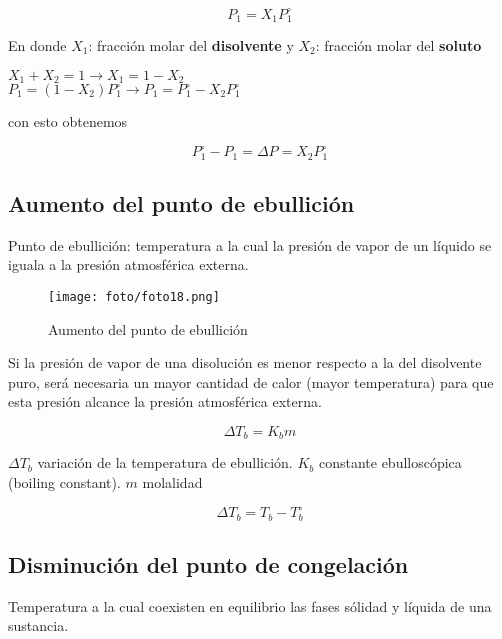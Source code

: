 \documentclass[]{article}
\begin{document}
\begin{equation}
P_{1}=X_{1}P_{1}^{\circ}
\end{equation}

En donde $X_{1}$: fracción molar del \textbf{disolvente} y $X_{2}$: fracción molar del \textbf{soluto} 

\begin{center}
	$X_{1}+X_{2}=1 \rightarrow X_{1}=1-X_{2}$ \\
	$P_{1}=(1-X_{2})P_{1}^{\circ} \rightarrow P_{1}=P_{1}^{\circ} - X_{2}P_{1}^{\circ}$
\end{center}

con esto obtenemos

\begin{equation}
P_{1}^{\circ}-P_{1}=\Delta P= X_{2}P_{1}^{\circ}
\end{equation}



\subsection{Aumento del punto de ebullición}
Punto de ebullición: temperatura a la cual la presión de vapor de un líquido se iguala a la presión atmosférica externa.

\begin{figure}[H]
\center
\texttt{[image: foto/foto18.png]}
\caption{Aumento del punto de ebullición}
\end{figure}

Si la presión de vapor de una disolución es menor respecto a la del disolvente puro, será necesaria un mayor cantidad de calor (mayor temperatura) para que esta presión alcance la presión atmosférica externa.

\begin{equation}
\Delta T_{b}=K_{b}m
\end{equation}

$\Delta T_{b}$ variación de la temperatura de ebullición. $K_{b}$ constante ebulloscópica (boiling constant). $m$ molalidad

\begin{equation}
\Delta T_{b}=T_{b}-T_{b}^{\circ}
\end{equation}



\subsection{Disminución del punto de congelación}
Temperatura a la cual coexisten en equilibrio las fases sólidad y líquida de una sustancia.
\end{document}

